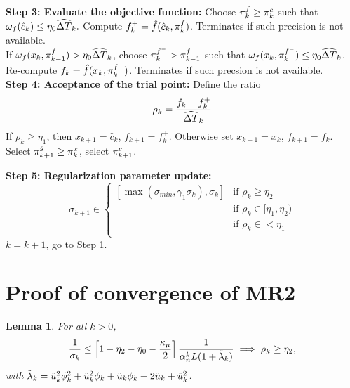 \documentclass{article}[12pt]
\newtheorem{lemma}[]{Lemma}
\begin{document}
\begin{algorithm}
\begin{algorithmic}
				
				
				
				\State \textbf{Step 3: Evaluate the objective function: }
				Choose $\pi_{k}^f\geq \pi_{k}^c$ such that $\omega_f(\hat{c}_{k})\leq \eta_0 \widehat{\Delta T}_k.$ Compute $f_k^+ = \hat{f}(\hat{c}_k,\pi_{k}^f)$. Terminates if such precision is not available.\\
				If $\omega_f(x_k,\pi_{k-1}^f)> \eta_0 \widehat{\Delta T}_k$, choose $\pi_{k}^{f^-}>\pi_{k-1}^f$ such that $\omega_f(x_k,\pi_{k}^{f^-})\leq \eta_0\widehat{\Delta T}_k$. Re-compute $f_k = \hat{f}(x_k,\pi_{k}^{f^-})$.
				Terminates if such precsion is not available.\\
				
				\State \textbf{Step 4: Acceptance of the trial point: } Define the ratio
				\begin{equation}
					\rho_k = \dfrac{f_k - f_k^+}{\widehat{\Delta T}_k}
				\end{equation}
				If $\rho_k \geq \eta_1$, then $x_{k+1} =\hat{c}_k$, $f_{k+1} = f_k^+$. Otherwise set $x_{k+1} = x_k$, $f_{k+1} = f_k$.\\
				Select $\pi_{k+1}^g \geq \pi_{k}^x$,  select $\pi_{k+1}^c$.
				
				\State \textbf{Step 5: Regularization  parameter update: }
				\begin{equation}
					\label{eq:sigma_update_multi}
					\sigma_{k+1} \in \left\{
					\begin{array}{ll}
						[\max(\sigma_{min},\gamma_1\sigma_k),\sigma_k] & \text{if } \rho_k \geq \eta_2\\
						
						[\sigma_k,\gamma_2\sigma_k] & \text{if }\rho_k \in [\eta_1,\eta_2) \\
						
						[\gamma_2\sigma_k,\gamma_3\sigma_k] & \text{if } \rho_k \in < \eta_1 \\
					\end{array}
					\right.
				\end{equation}
				$k = k+1$, go to Step 1.
				
			\end{algorithmic}
		\end{algorithm}
	
	
	\section{Proof of convergence of MR2}
	\label{sec:proof_mp}
	
	\begin{lemma}
		\label{lem:sigma-very-successful-multi}
		For all $k>0$,
		\begin{equation}
			\dfrac{1}{\sigma_k} \leq \left[1-\eta_2 - \eta_0 - \dfrac{\kappa_\mu}{2}\right]\dfrac{1}{\alpha_n^k L(1+\tilde{\lambda}_k)} \implies \rho_k\geq \eta_2,
		\end{equation} 
		with $\tilde{\lambda}_k = \tilde{u}_{k}^2\phi_k^2+\tilde{u}_{k}^2\phi_k + \tilde{u}_{k}\phi_k +2\tilde{u}_{k}+\tilde{u}_{k}^2$.
	\end{lemma}
	
\end{document}
